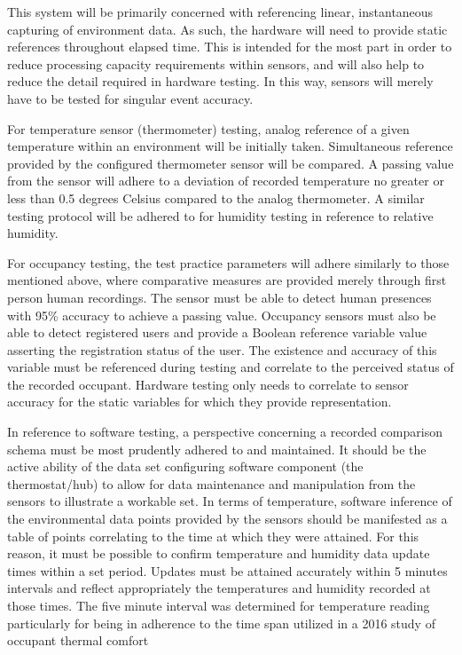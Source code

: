 \documentclass{article}
\begin{document}
This system will be primarily concerned with referencing linear, instantaneous capturing of environment data. As such, the hardware will need to provide static references throughout elapsed time. This is intended for the most part in order to reduce processing capacity requirements within sensors, and will also help to reduce the detail required in hardware testing. In this way, sensors will merely have to be tested for singular event accuracy. 

For temperature sensor (thermometer) testing, analog reference of a given temperature within an environment will be initially taken. Simultaneous reference provided by the configured thermometer sensor will be compared. A passing value from the sensor will adhere to a deviation of recorded temperature no greater or less than 0.5 degrees Celsius compared to the analog thermometer. A similar testing protocol will be adhered to for humidity testing in reference to relative humidity. 

For occupancy testing, the test practice parameters will adhere similarly to those mentioned above, where comparative measures are provided merely through first person human recordings. The sensor must be able to detect human presences with 95\% accuracy to achieve a passing value. Occupancy sensors must also be able to detect registered users and provide a Boolean reference variable value asserting the registration status of the user. The existence and accuracy of this variable must be referenced during testing and correlate to the perceived status of the recorded occupant. Hardware testing only needs to correlate to sensor accuracy for the static variables for which they provide representation.

In reference to software testing, a perspective concerning a recorded comparison schema must be most prudently adhered to and maintained. It should be the active ability of the data set configuring software component (the thermostat/hub) to allow for data maintenance and manipulation from the sensors to illustrate a workable set. In terms of temperature, software inference of the environmental data points provided by the sensors should be manifested as a table of points correlating to the time at which they were attained. For this reason, it must be possible to confirm temperature and humidity data update times within a set period. Updates must be attained accurately within 5 minutes intervals and reflect appropriately the temperatures and humidity recorded at those times. The five minute interval was determined for temperature reading particularly for being in adherence to the time span utilized in a 2016 study of occupant thermal comfort \cite{r5}
\end{document}
